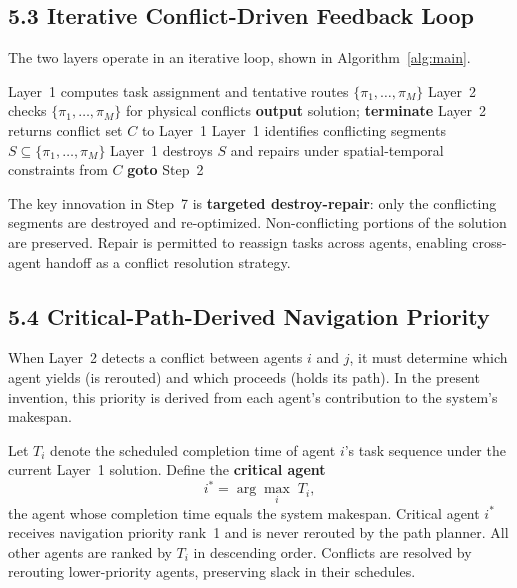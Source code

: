\documentclass[12pt]{article}
\begin{document}
\subsection{5.3 \quad Iterative Conflict-Driven Feedback Loop}

The two layers operate in an iterative loop, shown in Algorithm~\ref{alg:main}.

\begin{algorithm}[H]
\caption{Multi-Agent Resource Transport with Cross-Agent Handoff}\label{alg:main}
\begin{algorithmic}[1]
\State Layer~1 computes task assignment and tentative routes $\{\pi_1, \ldots, \pi_M\}$
\State Layer~2 checks $\{\pi_1, \ldots, \pi_M\}$ for physical conflicts
    \State \textbf{output} solution; \textbf{terminate}
\EndIf
\State Layer~2 returns conflict set $C$ to Layer~1
\State Layer~1 identifies conflicting segments $S \subseteq \{\pi_1, \ldots, \pi_M\}$
\State Layer~1 destroys $S$ and repairs under spatial-temporal constraints from $C$
\State \textbf{goto} Step~2
\end{algorithmic}
\end{algorithm}

The key innovation in Step~7 is \textbf{targeted destroy-repair}: only the conflicting segments are destroyed and re-optimized. Non-conflicting portions of the solution are preserved. Repair is permitted to reassign tasks across agents, enabling cross-agent handoff as a conflict resolution strategy.

\subsection{5.4 \quad Critical-Path-Derived Navigation Priority}

When Layer~2 detects a conflict between agents $i$ and $j$, it must determine which agent yields (is rerouted) and which proceeds (holds its path). In the present invention, this priority is derived from each agent's contribution to the system's makespan.

Let $T_i$ denote the scheduled completion time of agent $i$'s task sequence under the current Layer~1 solution. Define the \textbf{critical agent}
\[
    i^* = \arg\max_i\; T_i,
\]
the agent whose completion time equals the system makespan. Critical agent $i^*$ receives navigation priority rank~1 and is never rerouted by the path planner. All other agents are ranked by $T_i$ in descending order. Conflicts are resolved by rerouting lower-priority agents, preserving slack in their schedules.
\end{document}
